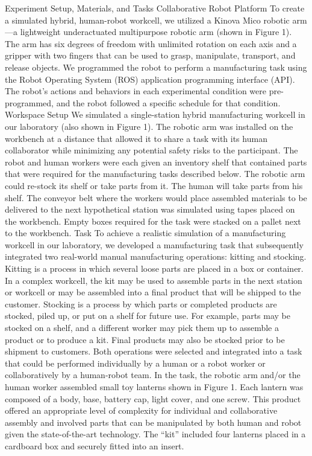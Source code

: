 Experiment Setup, Materials, and Tasks
Collaborative Robot Platform
       To create a simulated hybrid, human-robot workcell, we utilized a Kinova Mico robotic arm—a lightweight underactuated multipurpose robotic arm (shown in Figure 1). The arm has six degrees of freedom with unlimited rotation on each axis and a gripper with two fingers that can be used to grasp, manipulate, transport, and release objects. We programmed the robot to perform a manufacturing task using the Robot Operating System (ROS) application programming interface (API). The robot’s actions and behaviors in each experimental condition were pre-programmed, and the robot followed a specific schedule for that condition.
Workspace Setup
        We simulated a single-station hybrid manufacturing workcell in our laboratory (also shown in Figure 1). The robotic arm was installed on the workbench at a distance that allowed it to share a task with its human collaborator while minimizing any potential safety risks to the participant. The robot and human workers were each given an inventory shelf that contained parts that were required for the manufacturing tasks described below. The robotic arm could re-stock its shelf or take parts from it. The human will take parts from his shelf. The  conveyor belt where the workers would place assembled materials to be delivered to the next hypothetical station was simulated using tapes placed on the workbench. Empty boxes required for the task were stacked on a pallet next to the workbench.
Task
       To achieve a realistic simulation of a manufacturing workcell in our laboratory, we developed a manufacturing task that subsequently integrated two real-world manual manufacturing operations: kitting and stocking. Kitting is a process in which several loose parts are placed in a box or container. In a complex workcell, the kit may be used to assemble parts in the next station or workcell  or may be assembled into a final product that will be shipped to the customer.  Stocking is a process by which parts or completed products are stocked, piled up, or put on a shelf for future use. For example, parts may be stocked on a shelf, and a different  worker may pick them up to assemble a product or to produce a kit. Final products may also be stocked prior to be shipment to customers. Both operations were selected and integrated into a task that could be performed individually by a human or a robot worker or collaboratively by a human-robot team.
       In the task, the robotic arm and/or the human worker assembled small toy lanterns shown in Figure 1. Each lantern was composed of a body, base, battery cap, light cover, and one screw. This product offered an appropriate level of complexity for individual and collaborative assembly and involved parts that can be manipulated by both human and robot given the state-of-the-art technology.  The “kit” included four lanterns placed in a cardboard box and securely fitted into an insert.
